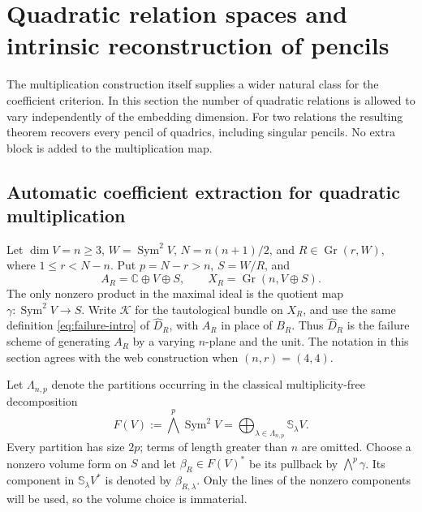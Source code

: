 \documentclass[11pt,reqno]{amsart}
\numberwithin{equation}{section}
\theoremstyle{definition}\newtheorem{definition}[theorem]{Definition}
\theoremstyle{remark}\newtheorem{remark}[theorem]{Remark}
\newcommand{\C}{\mathbb C}\newcommand{\Q}{\mathbb Q}
\DeclareMathOperator{\Sym}{Sym}\DeclareMathOperator{\Gr}{Gr}
\begin{document}
\section{Quadratic relation spaces and intrinsic reconstruction of pencils}
\label{sec:natural-pencils}

The multiplication construction itself supplies a wider natural class
for the coefficient criterion.  In this section the number of quadratic
relations is allowed to vary independently of the embedding dimension.
For two relations the resulting theorem recovers every pencil of
quadrics, including singular pencils.  No extra block is added to the
multiplication map.

\subsection{Automatic coefficient extraction for quadratic multiplication}

Let \(\dim V=n\ge3\), \(W=\Sym^2V\), \(N=n(n+1)/2\), and
\(R\in\Gr(r,W)\), where \(1\le r<N-n\).  Put \(p=N-r>n\),
\(S=W/R\), and
\[
 A_R=\C\oplus V\oplus S,\qquad
 X_R=\Gr(n,V\oplus S).
\]
The only nonzero product in the maximal ideal is the quotient map
\(\gamma:\Sym^2V\to S\).  Write \(\mathcal K\) for the
tautological bundle on \(X_R\), and use the same definition
\eqref{eq:failure-intro} of \(\widehat D_R\), with \(A_R\) in
place of \(B_R\).  Thus \(\widehat D_R\) is the failure scheme
of generating \(A_R\) by a varying \(n\)-plane and the unit.
The notation in this section agrees with the web construction when
\((n,r)=(4,4)\).

Let \(\Lambda_{n,p}\) denote the partitions occurring in the
classical multiplicity-free decomposition
\begin{equation}\label{eq:general-exterior-decomposition}
 F(V):=\bigwedge^p\Sym^2V
       =\bigoplus_{\lambda\in\Lambda_{n,p}}\mathbb S_\lambda V.
\end{equation}
Every partition has size \(2p\); terms of length greater than \(n\)
are omitted.  Choose a nonzero volume form on \(S\) and let
\(\beta_R\in F(V)^*\) be its pullback by \(\bigwedge^p\gamma\).
Its component in \(\mathbb S_\lambda V^*\) is denoted by
\(\beta_{R,\lambda}\).  Only the lines of the nonzero components
will be used, so the volume choice is immaterial.
\end{document}
